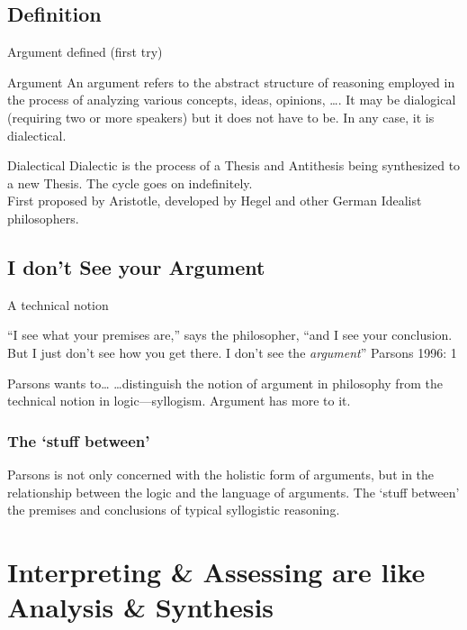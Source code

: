 \documentclass{beamer}
\begin{document}
\subsection{Definition}
\begin{frame}{Argument defined (first try)}
\begin{exampleblock}{\sc Argument}
An argument refers to the abstract structure of reasoning employed in the process of analyzing various concepts, ideas, opinions, \ldots. It may be dialogical (requiring two or more speakers) but it does not have to be. In any case, it is dialectical.
\end{exampleblock}
\begin{block}{Dialectical}
Dialectic is the process of a Thesis and Antithesis being synthesized to a new Thesis. The cycle goes on indefinitely.\\ First proposed by Aristotle, developed by Hegel and other German Idealist philosophers.
\end{block}
 \end{frame}\label{firsttry}


 
\subsection{I don't See your Argument}
\begin{frame}{A technical notion}
\begin{block}{}
``I see what your premises are,'' says the philosopher, ``and I see your conclusion.  But I just don't see how you get there.  I don't see the \textsl{argument}'' {Parsons 1996: 1}
\end{block}
\pause
\begin{block}{Parsons wants to\dots}
\ldots distinguish the notion of argument in philosophy from the technical notion in logic---syllogism. Argument has more \color{blue}{stuff} to it.  
\end{block} 
\end{frame}

\begin{frame}\frametitle{The `stuff between'}
Parsons is not only concerned with the holistic form of arguments, but in the relationship between the logic and the language of arguments. The `stuff between' the premises and conclusions of typical syllogistic reasoning.
\end{frame}


\section{Interpreting \& Assessing are like Analysis \& Synthesis}
\end{document}
